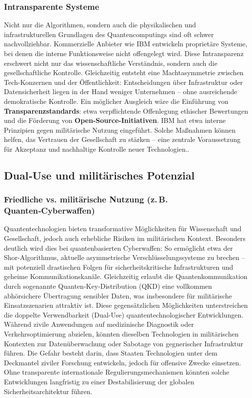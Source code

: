 \subsubsection{Intransparente Systeme }
Nicht nur die Algorithmen, sondern auch die physikalischen und infrastrukturellen Grundlagen des Quantencomputings sind oft schwer nachvollziehbar. Kommerzielle Anbieter wie IBM entwickeln proprietäre Systeme, bei denen die interne Funktionsweise nicht offengelegt wird. Diese Intransparenz erschwert nicht nur das wissenschaftliche Verständnis, sondern auch die gesellschaftliche Kontrolle.\cite{noauthor_defining_nodate}
Gleichzeitig entsteht eine Machtasymmetrie zwischen Tech-Konzernen und der Öffentlichkeit: Entscheidungen über Infrastruktur oder Datensicherheit liegen in der Hand weniger Unternehmen – ohne ausreichende demokratische Kontrolle.\cite{noauthor_ethics_nodate}
Ein möglicher Ausgleich wäre die Einführung von \textbf{Transparenzstandards}: etwa verpflichtende Offenlegung ethischer Bewertungen und die Förderung von \textbf{Open-Source-Initiativen}. IBM hat etwa interne Prinzipien gegen militärische Nutzung eingeführt.\cite{noauthor_defining_nodate} Solche Maßnahmen können helfen, das Vertrauen der Gesellschaft zu stärken – eine zentrale Voraussetzung für Akzeptanz und nachhaltige Kontrolle neuer Technologien.\cite{noauthor_quantum_nodate}.
 
\subsection{Dual‑Use und militärisches Potenzial}
\subsubsection{Friedliche vs. militärische Nutzung (z. B. Quanten‑Cyberwaffen)}
Quantentechnologien bieten transformative Möglichkeiten für Wissenschaft und Gesellschaft, jedoch auch erhebliche Risiken im militärischen Kontext. Besonders deutlich wird dies bei quantenbasierten Cyberwaffen: So ermöglicht etwa der Shor-Algorithmus, aktuelle asymmetrische Verschlüsselungssysteme zu brechen – mit potenziell drastischen Folgen für sicherheitskritische Infrastrukturen und geheime Kommunikationskanäle\cite{krelina_quantum_2021}. Gleichzeitig erlaubt die Quantenkommunikation durch sogenannte Quanten‑Key‑Distribution (QKD) eine vollkommen abhörsichere Übertragung sensibler Daten, was insbesondere für militärische Einsatzszenarien attraktiv ist\cite{neumann_quantum_2020}.
Diese gegensätzlichen Möglichkeiten unterstreichen die doppelte Verwendbarkeit (Dual-Use) quantentechnologischer Entwicklungen. Während zivile Anwendungen auf medizinische Diagnostik oder Verkehrsoptimierung abzielen, könnten dieselben Technologien in militärischen Kontexten zur Datenüberwachung oder Sabotage von gegnerischer Infrastruktur führen. Die Gefahr besteht darin, dass Staaten Technologien unter dem Deckmantel ziviler Forschung entwickeln, jedoch für offensive Zwecke einsetzen. Ohne transparente internationale Regulierungsmechanismen könnten solche Entwicklungen langfristig zu einer Destabilisierung der globalen Sicherheitsarchitektur führen.

